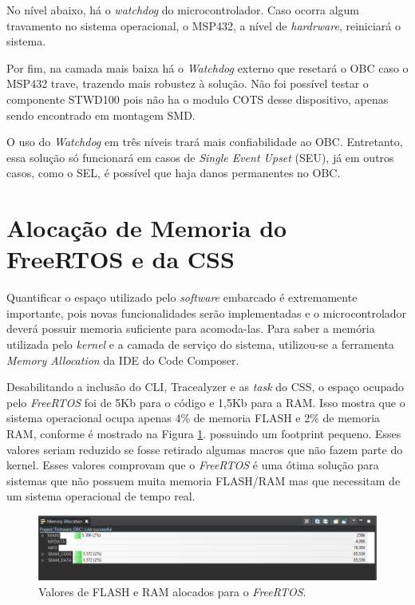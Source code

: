 No nível abaixo, há o \textit{watchdog} do microcontrolador. Caso ocorra algum travamento no sistema operacional, o MSP432, a nível de \textit{hardrware}, reiniciará o sistema.

Por fim, na camada mais baixa há o \textit{Watchdog} externo que resetará o OBC caso o MSP432 trave, trazendo mais robustez à solução. Não foi possível testar o componente STWD100 pois não ha o modulo COTS desse dispositivo, apenas sendo encontrado em montagem SMD. 

O uso do \textit{Watchdog} em três níveis trará mais confiabilidade ao OBC. Entretanto, essa solução só funcionará em casos de \textit{Single Event Upset} (SEU), já em outros casos, como o SEL, é possível que haja danos permanentes no OBC. 

\section{Alocação de Memoria do FreeRTOS e da CSS}

Quantificar o espaço utilizado pelo \textit{software} embarcado é extremamente importante, pois novas funcionalidades serão implementadas e o microcontrolador deverá possuir memoria suficiente para acomoda-las. Para saber a memória utilizada pelo \textit{kernel} e a camada de serviço do sistema, utilizou-se a ferramenta \textit{Memory Allocation} da IDE do Code Composer. 

Desabilitando a inclusão do CLI, Tracealyzer e as \textit{task} do CSS, o espaço ocupado pelo \textit{FreeRTOS} foi de 5Kb para o código e 1,5Kb para a RAM. Isso mostra que o sistema operacional ocupa apenas 4\% de memoria FLASH e 2\% de memoria RAM, conforme é mostrado na Figura \ref{memoryAllocation_RTOS}. possuindo um footprint pequeno. Esses valores seriam reduzido se fosse retirado algumas macros que não fazem parte do kernel. Esses valores comprovam que o \textit{FreeRTOS} é uma ótima solução para sistemas que não possuem muita memoria FLASH/RAM mas que necessitam de um sistema operacional de tempo real. 

\begin{figure}[h]
	\centering

	\includegraphics[keepaspectratio=true,scale=0.6]{figuras/memoryAllocation_RTOS.PNG}
	\caption{Valores de FLASH e RAM alocados para o \textit{FreeRTOS}.}	
	\label{memoryAllocation_RTOS}
\end{figure}
\FloatBarrier

